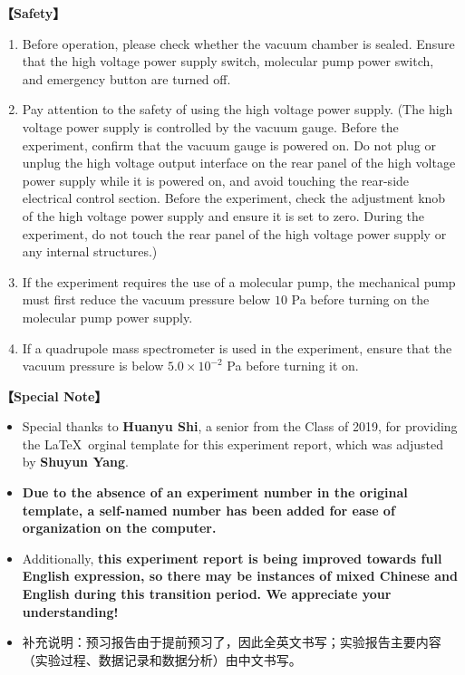\textbf{【Safety】}	
\begin{enumerate}
	\item Before operation, please check whether the vacuum chamber is sealed. Ensure that the high voltage power supply switch, molecular pump power switch, and emergency button are turned off.
	
	\item Pay attention to the safety of using the high voltage power supply. (The high voltage power supply is controlled by the vacuum gauge. Before the experiment, confirm that the vacuum gauge is powered on. Do not plug or unplug the high voltage output interface on the rear panel of the high voltage power supply while it is powered on, and avoid touching the rear-side electrical control section. Before the experiment, check the adjustment knob of the high voltage power supply and ensure it is set to zero. During the experiment, do not touch the rear panel of the high voltage power supply or any internal structures.)
	
	\item If the experiment requires the use of a molecular pump, the mechanical pump must first reduce the vacuum pressure below $10$ Pa before turning on the molecular pump power supply.
	
	\item If a quadrupole mass spectrometer is used in the experiment, ensure that the vacuum pressure is below $5.0\times10^{-2}$ Pa before turning it on.
\end{enumerate}	
	
	
\textbf{【Special Note】}	
\begin{itemize}
	\item Special thanks to \textbf{Huanyu Shi}, a senior from the Class of 2019, for providing the \LaTeX \ orginal template for this experiment report, which was adjusted by \textbf{Shuyun Yang}. 
	
	\item \textbf{Due to the absence of an experiment number in the original template, a self-named number has been added for ease of organization on the computer.} 
	
	\item Additionally, \textcolor{fred}{\large\textbf{this experiment report is being improved towards full English expression, so there may be instances of mixed Chinese and English during this transition period. We appreciate your understanding!}}
	
	\item 补充说明：预习报告由于提前预习了，因此全英文书写；实验报告主要内容（实验过程、数据记录和数据分析）由中文书写。
\end{itemize}
	

\clearpage
\tableofcontents		